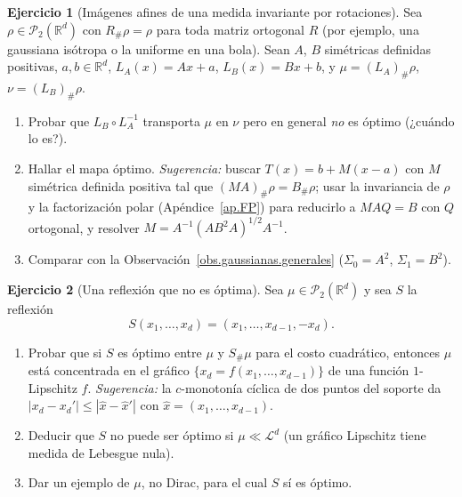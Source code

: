 \documentclass[12pt, a4paper]{amsbook}
\newcommand{\R}{{\mathbb R}}
\newcommand{\LL}{{\mathcal L}}
\theoremstyle{remark}
\theoremstyle{definition}
\newtheorem{ejercicio}{Ejercicio}[chapter]
\numberwithin{section}{chapter}
\numberwithin{subsection}{section}
\numberwithin{equation}{section}
\numberwithin{figure}{chapter}
\begin{document}
\begin{ejercicio}[Imágenes afines de una medida invariante por rotaciones]\label{ejer.Brenier.afines}
Sea $\rho\in\mathcal P_2(\R^d)$ con $R_\#\rho=\rho$ para toda matriz
ortogonal $R$ (por ejemplo, una gaussiana isótropa o la uniforme en una
bola). Sean $A$, $B$ simétricas definidas positivas, $a,b\in\R^d$,
$L_A(x)=Ax+a$, $L_B(x)=Bx+b$, y $\mu=(L_A)_\#\rho$, $\nu=(L_B)_\#\rho$.
\begin{enumerate}[label=(\alph*)]
\item Probar que $L_B\circ L_A^{-1}$ transporta $\mu$ en $\nu$ pero en
general \emph{no} es óptimo (¿cuándo lo es?).
\item Hallar el mapa óptimo. \emph{Sugerencia:} buscar $T(x)=b+M(x-a)$ con
$M$ simétrica definida positiva tal que $(MA)_\#\rho=B_\#\rho$; usar la
invariancia de $\rho$ y la factorización polar (Apéndice~\ref{ap.FP}) para
reducirlo a $MAQ=B$ con $Q$ ortogonal, y resolver
$M=A^{-1}(AB^2A)^{1/2}A^{-1}$.
\item Comparar con la Observación~\ref{obs.gaussianas.generales}
($\Sigma_0=A^2$, $\Sigma_1=B^2$).
\end{enumerate}
\end{ejercicio}

\begin{ejercicio}[Una reflexión que no es óptima]\label{ejer.Brenier.reflexion}
Sea $\mu\in\mathcal P_2(\R^d)$ y sea $S$ la reflexión
\[
S(x_1,\dots,x_d)=(x_1,\dots,x_{d-1},-x_d).
\]
\begin{enumerate}[label=(\alph*)]
\item Probar que si $S$ es óptimo entre $\mu$ y $S_\#\mu$ para el costo
cuadrático, entonces $\mu$ está concentrada en el gráfico
$\{x_d=f(x_1,\dots,x_{d-1})\}$ de una función $1$-Lipschitz $f$.
\emph{Sugerencia:} la $c$-monotonía cíclica de dos puntos del soporte da
$|x_d-x_d'|\le|\hat x-\hat x'|$ con $\hat x=(x_1,\dots,x_{d-1})$.
\item Deducir que $S$ no puede ser óptimo si $\mu\ll\LL^d$ (un gráfico
Lipschitz tiene medida de Lebesgue nula).
\item Dar un ejemplo de $\mu$, no Dirac, para el cual $S$ sí es óptimo.
\end{enumerate}
\end{ejercicio}
\end{document}
